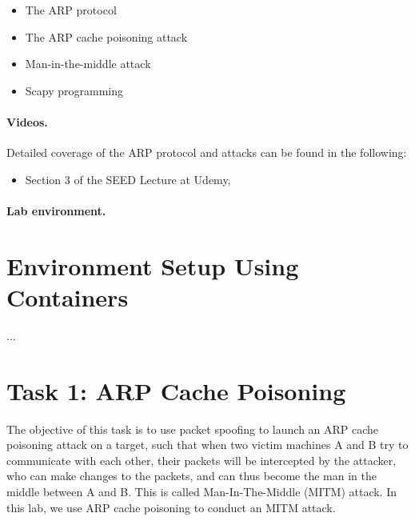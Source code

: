 \begin{itemize}[noitemsep]
\item The ARP protocol
\item The ARP cache poisoning attack
\item Man-in-the-middle attack
\item Scapy programming
\end{itemize}
 


\paragraph{Videos.}
Detailed coverage of the ARP protocol and attacks can be found in the following:

\begin{itemize}
\item Section 3 of the SEED Lecture at Udemy, \seedisvideo
\end{itemize}


\paragraph{Lab environment.} \seedenvironment




\section{Environment Setup Using Containers}

...



\section{Task 1: ARP Cache Poisoning}


The objective of this task is to use packet spoofing to launch an ARP cache poisoning attack on
a target, such that when two victim machines A and B try to communicate with each other, their
packets will be intercepted by the attacker, who can make changes to the packets, and can thus
become the man in the middle between A and B. This is called Man-In-The-Middle (MITM) attack.
In this lab, we use ARP cache poisoning to conduct an MITM attack. 



